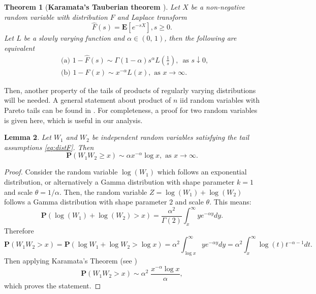 \documentclass[11pt, reqno]{amsart}
\numberwithin{equation}{section}
\theoremstyle{plain} %
\newtheorem{theorem}{Theorem}
\newtheorem{lemma}[theorem]{Lemma}
\theoremstyle{definition} %
\newcommand{\prob}{\mathbf{P}}
\newcommand{\E}{\mathbf{E}}
\begin{document}
\begin{theorem}[{\bf Karamata's Tauberian theorem \cite[Theorem 8.1.6]{bingham1989regular}}]\label{app: Tauberian}
Let $X$ be a non-negative random variable with distribution $F$ and Laplace transform $$\widehat F(s)= \E\left[ e^{-sX}\right], s\ge 0.$$ 
Let $L$ be a slowly varying function and $\alpha\in (0,\, 1)$, then the following are equivalent
\begin{equation}
    \begin{split}
        &\text{(a) } 1- \widehat F(s)\sim \Gamma(1-\alpha) s^{\alpha} L\left(\frac{1}{s}\right),\,  \text{ as $s\downarrow 0$},\\
        &\text{(b) } 1- F(x)\sim x^{-\alpha} L(x), \text{ as $x\to \infty$}.
    \end{split}
\end{equation}
\end{theorem}

Then,  another property of the tails of products of regularly varying distributions will be needed. A general statement about product of $n$ iid random variables with Pareto tails can be found in \cite[Lemma 4.1 (4)]{AndersHedegaardJessen2006}. For completeness, a proof for two random variables is given here, which is useful in our analysis.

\begin{lemma}\label{lemma:product}
Let $W_1$ and $W_2$ be independent random variables satisfying the tail assumptions \eqref{eq:distF}. Then
\begin{equation}\label{eq: product}
\prob( W_1 W_2\ge x)\sim \alpha x^{-\alpha} \log x, \text{ as $x\to \infty$}.
\end{equation}
\end{lemma}
\begin{proof}
Consider the random variable $\log(W_1)$ which follows an exponential distribution, or alternatively a Gamma distribution with shape parameter $k=1$ and scale $\theta = 1/\alpha$.
Then, the random variable $Z = \log(W_1) + \log(W_2)$ follows a Gamma distribution with shape parameter $2$ and scale $\theta$. This means:
\begin{equation*}
    \prob(\log(W_1) + \log(W_2) > x) =  \frac{\alpha^2}{\Gamma(2)} \int_{x}^{\infty} y  e^{-\alpha y} dy.
\end{equation*}
Therefore
\begin{equation}
    \prob(W_1 W_2 > x) = \prob(\log{W_1}  + \log{ W_2} > \log{x})=   \alpha^2  \int_{\log{x}}^{\infty} y  e^{-\alpha y} dy =  \alpha^2  \int_{x}^{\infty} \log(t)  t^{-\alpha -1} dt. 
\end{equation}
Then applying Karamata's Theorem (see \cite[Theorem 12]{AndersHedegaardJessen2006})
\begin{equation}
    \prob(W_1 W_2 > x) \sim \alpha^2 \; \frac{x^{-\alpha}\log{x}}{\alpha},
\end{equation}
which proves the statement.

\end{proof}
\end{document}
